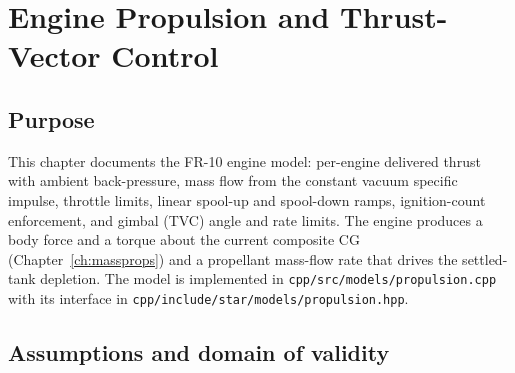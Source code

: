 \chapter{Engine Propulsion and Thrust-Vector Control}
\label{ch:propulsion}

\section{Purpose}
\label{sec:propulsion:purpose}

This chapter documents the FR-10 engine model: per-engine delivered
thrust with ambient back-pressure, mass flow from the constant vacuum
specific impulse, throttle limits, linear spool-up and spool-down ramps,
ignition-count enforcement, and gimbal (TVC) angle and rate limits. The
engine produces a body force and a torque about the current composite CG
(Chapter~\ref{ch:massprops}) and a propellant mass-flow rate that drives
the settled-tank depletion. The model is implemented in
\texttt{cpp/src/models/propulsion.cpp} with its interface in
\texttt{cpp/include/star/models/propulsion.hpp}.

\section{Assumptions and domain of validity}
\label{sec:propulsion:domain}


